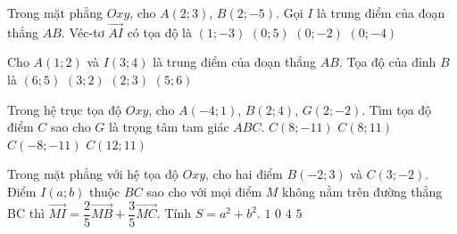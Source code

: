 \begin{ex}%
	Trong mặt phẳng $Oxy$, cho $A(2;3)$, $B(2;-5)$. Gọi $I$ là trung điểm của đoạn thẳng $AB$. Véc-tơ $\overrightarrow{AI}$ có tọa độ là
	\choice
	{$(1;-3)$}
	{$(0;5)$}
	{$(0;-2)$}
	{\True $(0;-4)$}
\end{ex}
\begin{ex}%
	Cho $A(1; 2)$ và $I(3; 4)$ là trung điểm của đoạn thẳng $AB$. Tọa độ của đỉnh $B$ là
	\choice
	{$(6; 5)$}
	{$(3; 2)$}
	{$(2; 3)$}
	{\True $(5; 6)$}
\end{ex}
\begin{ex}%
	Trong hệ trục tọa độ $Oxy$, cho $A(-4;1)$, $B(2;4)$, $G(2;-2)$. Tìm tọa độ điểm $C$ sao cho $G$ là trọng tâm tam giác $ABC$.
	\choice
	{\True $C(8;-11)$}
	{$C(8;11)$}
	{$C(-8;-11)$}
	{$C(12;11)$}
\end{ex}
\begin{ex}%
	Trong mặt phẳng với hệ tọa độ $Oxy$, cho hai điểm $B(-2;3)$ và $C(3;-2)$. Điểm $I(a;b)$ thuộc $BC$ sao cho với mọi điểm $M$ không nằm trên đường thẳng BC thì $\overrightarrow{MI}=\dfrac{2}{5}\overrightarrow{MB}+\dfrac{3}{5}\overrightarrow{MC}$. Tính $S=a^2+b^2$.
	\choice
	{\True $1$}
	{$0$}
	{$4$}
	{$5$}
\end{ex}
